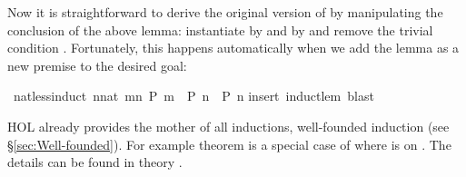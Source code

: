 \begin{isabellebody}
\begin{isamarkuptext}
Now it is straightforward to derive the original version of
 by manipulating the conclusion of the above
lemma: instantiate  by  and  by 
and remove the trivial condition . Fortunately, this
happens automatically when we add the lemma as a new premise to the
desired goal:%
\end{isamarkuptext}%
\ nat{\isacharunderscore}less{\isacharunderscore}induct{\isacharcolon}\ {\isachardoublequote}{\isacharparenleft}{\isasymAnd}n{\isacharcolon}{\isacharcolon}nat{\isachardot}\ {\isasymforall}m{\isacharless}n{\isachardot}\ P\ m\ {\isasymLongrightarrow}\ P\ n{\isacharparenright}\ {\isasymLongrightarrow}\ P\ n{\isachardoublequote}\isanewline
{}insert\ induct{\isacharunderscore}lem{\isacharcomma}\ blast{\isacharparenright}%
\begin{isamarkuptext}%
HOL already provides the mother of
all inductions, well-founded induction (see \S\ref{sec:Well-founded}).  For
example theorem  is
a special case of  where  is \isa{{\isacharless}} on
. The details can be found in theory .%
\end{isamarkuptext}%
\end{isabellebody}%
